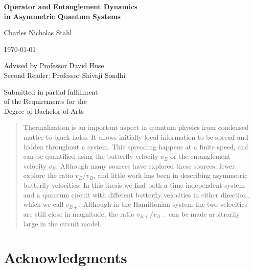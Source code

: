 {
\vspace*{.2in}
\begin{center}
	\huge{\textbf{Operator and Entanglement Dynamics \\
			        in Asymmetric Quantum Systems}}
\end{center}
\vspace{.6in}
\sc
\begin{center}
	\LARGE{Charles Nicholas Stahl}
\end{center}
\vspace{.6in}
\begin{center}
\today
\end{center}
\vspace{.6in}
\begin{center}
	{\Large Advised by Professor David Huse} \\
	Second Reader: Professor Shivaji Sondhi
\end{center}
\vspace{.6in}
\begin{center}
	Submitted in partial fulfillment \\
	of the Requirements for the \\
	Degree of Bachelor of Arts
\end{center}
}
\newpage

\begin{abstract}
	Thermalization is an important aspect in quantum physics from condensed matter to black holes. It allows initially local information to be spread and hidden throughout a system. This spreading happens at a finite speed, and can be quantified using the butterfly velocity $v_B$ or the entanglement velocity $v_E$. Although many sources have explored these sources, fewer explore the ratio $v_E/v_B$, and little work has been in describing asymmetric butterfly velocities. In this thesis we find both a time-independent system and a quantum circuit with different butterfly velocities in either direction, which we call $v_{B\pm}$. Although in the Hamiltonian system the two velocities are still close in magnitude, the ratio $v_{B+}/v_{B-}$ can be made arbitrarily large in the circuit model.
\end{abstract}

\newpage

\section*{Acknowledgments}

\newpage

\tableofcontents